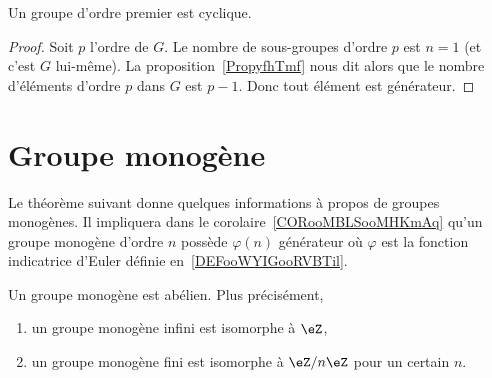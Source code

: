 \begin{corollary}
    Un groupe d'ordre premier est cyclique.
\end{corollary}

\begin{proof}
    Soit \( p\) l'ordre de \( G\). Le nombre de sous-groupes d'ordre \( p\) est \( n=1\) (et c'est \( G\) lui-même). La proposition~\ref{PropyfhTmf} nous dit alors que le nombre d'éléments d'ordre \( p\) dans \( G\) est \( p-1\). Donc tout élément est générateur.
\end{proof}


\section{Groupe monogène}
\label{SECooXIHPooWVSjhT}

Le théorème suivant donne quelques informations à propos de groupes monogènes. Il impliquera dans le corolaire~\ref{CORooMBLSooMHKmAq} qu'un groupe monogène d'ordre \( n\) possède \( \varphi(n)\) générateur où \( \varphi\) est la fonction indicatrice d'Euler définie en~\ref{DEFooWYIGooRVBTil}.

\begin{theorem}     \label{THOooDOMZooOEYHAe}
    Un groupe monogène est abélien. Plus précisément,
    \begin{enumerate}
        \item
            un groupe monogène infini est isomorphe à \( \eZ\),
        \item
            un groupe monogène fini est isomorphe à \( \eZ/n\eZ\) pour un certain \( n\).
    \end{enumerate}
\end{theorem}

